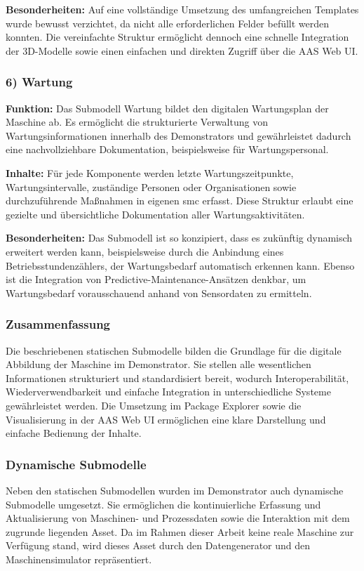\textbf{Besonderheiten:}  
Auf eine vollständige Umsetzung des umfangreichen Templates wurde bewusst verzichtet, da nicht alle erforderlichen Felder befüllt werden konnten.  
Die vereinfachte Struktur ermöglicht dennoch eine schnelle Integration der 3D-Modelle sowie einen einfachen und direkten Zugriff über die AAS Web UI.

\subsubsection*{6) Wartung}
\vspace{-0.5em}
\textbf{Funktion:}  
Das Submodell Wartung bildet den digitalen Wartungsplan der Maschine ab.  
Es ermöglicht die strukturierte Verwaltung von Wartungsinformationen innerhalb des Demonstrators und gewährleistet dadurch eine nachvollziehbare Dokumentation, beispielsweise für Wartungspersonal.

\textbf{Inhalte:}  
Für jede Komponente werden letzte Wartungszeitpunkte, Wartungsintervalle, zuständige Personen oder Organisationen sowie durchzuführende Maßnahmen in eigenen \acs{smc} erfasst.  
Diese Struktur erlaubt eine gezielte und übersichtliche Dokumentation aller Wartungsaktivitäten.

\textbf{Besonderheiten:}  
Das Submodell ist so konzipiert, dass es zukünftig dynamisch erweitert werden kann, beispielsweise durch die Anbindung eines Betriebsstundenzählers, der Wartungsbedarf automatisch erkennen kann.  
Ebenso ist die Integration von Predictive-Maintenance-Ansätzen denkbar, um Wartungsbedarf vorausschauend anhand von Sensordaten zu ermitteln.

\subsubsection*{Zusammenfassung}

Die beschriebenen statischen Submodelle bilden die Grundlage für die digitale Abbildung der Maschine im Demonstrator. 
Sie stellen alle wesentlichen Informationen strukturiert und standardisiert bereit, wodurch Interoperabilität, Wiederverwendbarkeit und einfache Integration in unterschiedliche Systeme gewährleistet werden. 
Die Umsetzung im Package Explorer sowie die Visualisierung in der AAS Web UI ermöglichen eine klare Darstellung und einfache Bedienung der Inhalte.

\newpage
\subsubsection{Dynamische Submodelle}
\label{sec:DynamischeSubmodelle}
Neben den statischen Submodellen wurden im Demonstrator auch dynamische Submodelle umgesetzt.
Sie ermöglichen die kontinuierliche Erfassung und Aktualisierung von Maschinen- und Prozessdaten sowie die Interaktion mit dem zugrunde liegenden Asset.
Da im Rahmen dieser Arbeit keine reale Maschine zur Verfügung stand, wird dieses Asset durch den Datengenerator und den Maschinensimulator repräsentiert.

